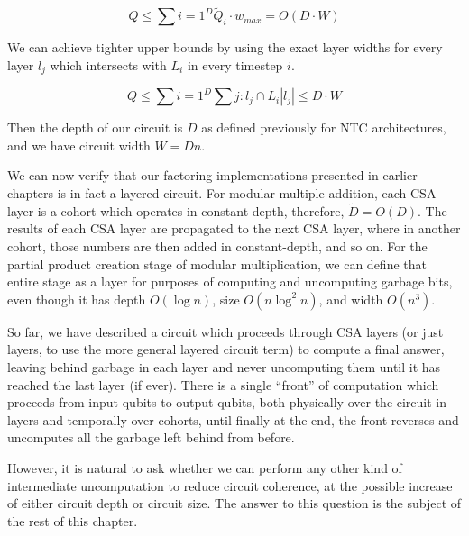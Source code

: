 \begin{equation}
Q \le \sum{i=1}^{D} \tilde{Q}_i \cdot w_{max} = O(D\cdot W)
\end{equation}

We can achieve tighter upper bounds by using the exact layer widths for every
layer $l_j$ which intersects with $L_i$ in every timestep $i$.

\begin{equation}
Q \le \sum{i=1}^{D} \sum{j: l_j \cap L_i} |l_j| \le D\cdot W
\end{equation}


Then the depth of our circuit is $D$ as defined previously for \textsf{NTC} architectures,
and we have circuit width $W = Dn$.


We can now verify that our factoring implementations presented in earlier
chapters is in fact a layered circuit. For modular multiple addition,
each CSA layer is a cohort
which operates in constant depth, therefore, $\tilde{D} = O(D)$.
The results of
each CSA layer are propagated to the next CSA layer, where in another cohort,
those numbers are then added in constant-depth, and so on.
For the partial product creation stage of modular multiplication, we can
define that entire stage as a layer for purposes of computing and uncomputing
garbage bits, even though it has depth $O(\log n)$, size $O(n\log^2 n)$, and
width $O(n^3)$.

So far, we have described a circuit which proceeds through CSA layers
(or just layers, to use the more general layered circuit term) to compute
a final answer, leaving behind garbage in each layer and never uncomputing
them until it has reached the last layer (if ever).
There is a single ``front'' of computation which
proceeds from input qubits to output qubits, both physically over the
circuit in layers and temporally over cohorts, until finally at the end,
the front reverses and uncomputes all the garbage left behind from before.

However,
it is natural to ask whether we
can perform any other kind of intermediate uncomputation to reduce
circuit coherence, at the possible increase of either circuit depth
or circuit size. The answer to this question is the subject of the
rest of this chapter.


